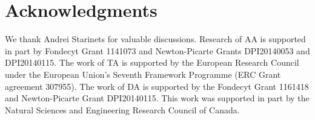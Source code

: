 \documentclass[11pt,epsf,letterpaper]{article}%
\begin{document}
\section*{Acknowledgments}

We thank Andrei Starinets for valuable discussions. Research of AA is
supported in part by Fondecyt Grant 1141073 and Newton-Picarte Grants
DPI20140053 and DPI20140115. The work of TA is supported by the European
Research Council under the European Union's Seventh Framework Programme (ERC
Grant agreement 307955). The work of DA is supported by the Fondecyt Grant
1161418 and Newton-Picarte Grant DPI20140115. This work was supported in part
by the Natural Sciences and Engineering Research Council of Canada.

\end{document}
